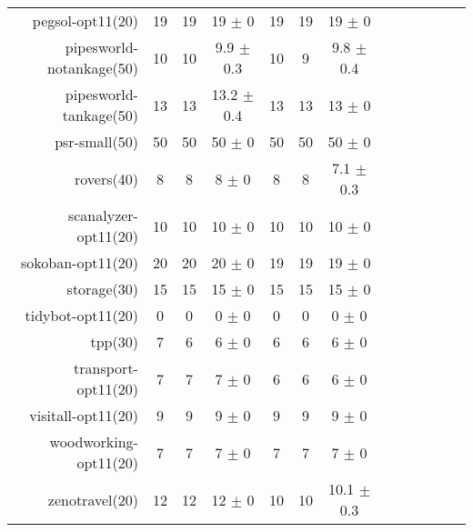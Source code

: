 \begin{center}
\begin{tabular}{|r|*{4}{ccc|}}
pegsol-opt11(20) & 19 & 19 & 19 \(\pm\) 0 & 19 & 19 & 19 \(\pm\) 0\\
pipesworld-notankage(50) & 10 & 10 & 9.9 \(\pm\) 0.3 & 10 & 9 & 9.8 \(\pm\) 0.4\\
pipesworld-tankage(50) & 13 & 13 & 13.2 \(\pm\) 0.4 & 13 & 13 & 13 \(\pm\) 0\\
psr-small(50) & 50 & 50 & 50 \(\pm\) 0 & 50 & 50 & 50 \(\pm\) 0\\
rovers(40) & 8 & 8 & 8 \(\pm\) 0 & 8 & 8 & 7.1 \(\pm\) 0.3\\
scanalyzer-opt11(20) & 10 & 10 & 10 \(\pm\) 0 & 10 & 10 & 10 \(\pm\) 0\\
sokoban-opt11(20) & 20 & 20 & 20 \(\pm\) 0 & 19 & 19 & 19 \(\pm\) 0\\
storage(30) & 15 & 15 & 15 \(\pm\) 0 & 15 & 15 & 15 \(\pm\) 0\\
tidybot-opt11(20) & 0 & 0 & 0 \(\pm\) 0 & 0 & 0 & 0 \(\pm\) 0\\
tpp(30) & 7 & 6 & 6 \(\pm\) 0 & 6 & 6 & 6 \(\pm\) 0\\
transport-opt11(20) & 7 & 7 & 7 \(\pm\) 0 & 6 & 6 & 6 \(\pm\) 0\\
visitall-opt11(20) & 9 & 9 & 9 \(\pm\) 0 & 9 & 9 & 9 \(\pm\) 0\\
woodworking-opt11(20) & 7 & 7 & 7 \(\pm\) 0 & 7 & 7 & 7 \(\pm\) 0\\
zenotravel(20) & 12 & 12 & 12 \(\pm\) 0 & 10 & 10 & 10.1 \(\pm\) 0.3\\
\end{tabular}
\end{center}
